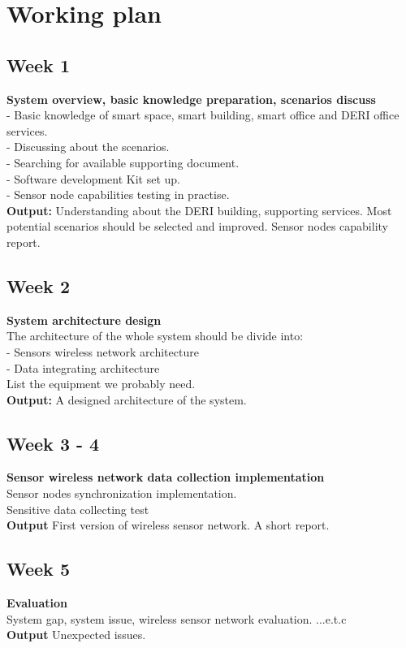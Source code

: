 \documentclass[a4paper]{llncs}
\newcommand{\head}[1]{\textnormal {\textbf{#1}}}
\begin{document}
\section{Working plan}
\subsection{Week 1}
\head{System overview, basic knowledge preparation, scenarios discuss }\\
- Basic knowledge of smart space, smart building, smart office and DERI office services.\\
- Discussing about the scenarios.\\
- Searching for available supporting document.\\
- Software development Kit set up.\\ 
- Sensor node capabilities testing in practise.\\
\head{Output: } Understanding about the DERI building, supporting services. Most potential scenarios should be selected and improved. Sensor nodes capability report.
\subsection{Week 2}
\head{System architecture design}\\
The architecture of the whole system should be divide into:\\
- Sensors wireless network architecture\\
- Data integrating architecture\\
List the equipment we probably need.\\
\head{Output:} A designed architecture of the system.
\subsection{Week 3 - 4}
\head{Sensor wireless network data collection implementation}\\
Sensor nodes synchronization implementation.\\
Sensitive data collecting test\\
\head{Output} First version of wireless sensor network. A short report.
\subsection{Week 5}
\head{Evaluation}\\
System gap, system issue, wireless sensor network evaluation. ...e.t.c\\
\head{Output} Unexpected issues.
\end{document}

